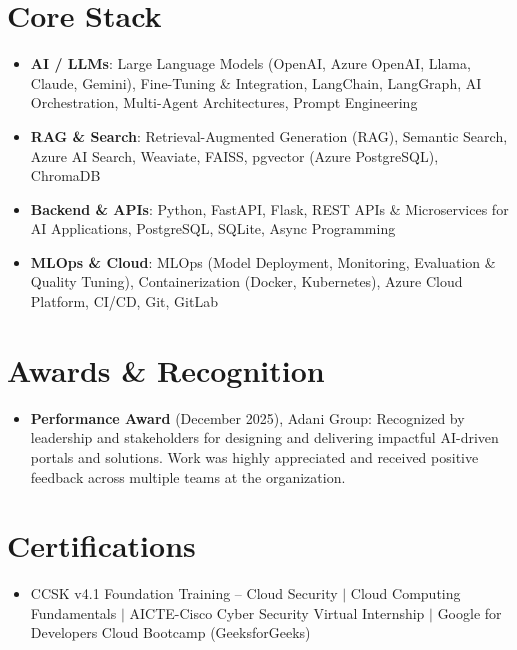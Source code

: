 \documentclass[letterpaper,11pt]{article}
\newcommand{\resumeSubHeadingListStart}{\begin{itemize}[leftmargin=*]}
\newcommand{\resumeSubHeadingListEnd}{\end{itemize}}
\begin{document}
\section{Core Stack}
 \resumeSubHeadingListStart
   \item{
     \textbf{AI / LLMs}{: Large Language Models (OpenAI, Azure OpenAI, Llama, Claude, Gemini), Fine-Tuning \& Integration, LangChain, LangGraph, AI Orchestration, Multi-Agent Architectures, Prompt Engineering}
   }\vspace{-4pt}
   \item{
     \textbf{RAG \& Search}{: Retrieval-Augmented Generation (RAG), Semantic Search, Azure AI Search, Weaviate, FAISS, pgvector (Azure PostgreSQL), ChromaDB}
   }\vspace{-4pt}
   \item{
     \textbf{Backend \& APIs}{: Python, FastAPI, Flask, REST APIs \& Microservices for AI Applications, PostgreSQL, SQLite, Async Programming}
   }\vspace{-4pt}
   \item{
     \textbf{MLOps \& Cloud}{: MLOps (Model Deployment, Monitoring, Evaluation \& Quality Tuning), Containerization (Docker, Kubernetes), Azure Cloud Platform, CI/CD, Git, GitLab}
   }
 \resumeSubHeadingListEnd


\section{Awards \& Recognition}
 \resumeSubHeadingListStart
   \item{\small{\textbf{Performance Award} (December 2025), Adani Group: Recognized by leadership and stakeholders for designing and delivering impactful AI-driven portals and solutions. Work was highly appreciated and received positive feedback across multiple teams at the organization.}}
 \resumeSubHeadingListEnd


\section{Certifications}
 \resumeSubHeadingListStart
   \item{\small{CCSK v4.1 Foundation Training -- Cloud Security $|$ Cloud Computing Fundamentals $|$ AICTE-Cisco Cyber Security Virtual Internship $|$ Google for Developers Cloud Bootcamp (GeeksforGeeks)}}
 \resumeSubHeadingListEnd

\end{document}
